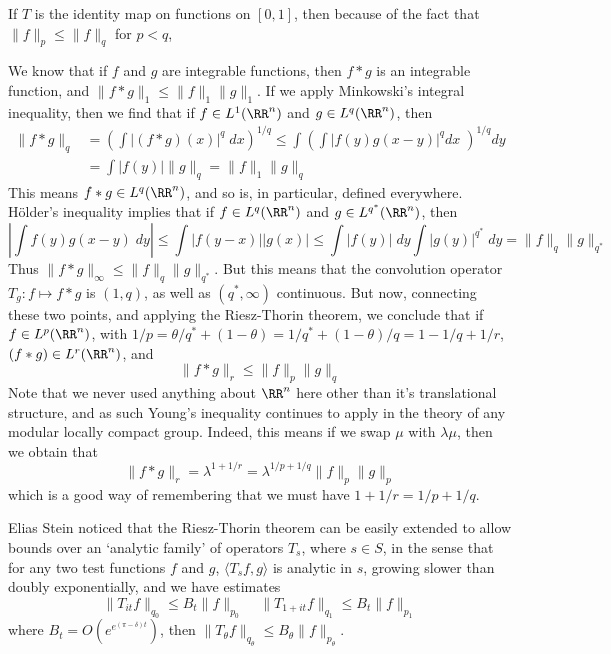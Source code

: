 \begin{example}
    If $T$ is the identity map on functions on $[0,1]$, then because of the fact that $\| f \|_p \leq \| f \|_q$ for $p < q$,
\end{example}

\begin{example}
    We know that if $f$ and $g$ are integrable functions, then $f * g$ is an integrable function, and $\| f * g \|_1 \leq \| f \|_1 \| g \|_1$. If we apply Minkowski's integral inequality, then we find that if $f \in L^1(\RR^n)$ and $g \in L^q(\RR^n)$, then
    \begin{align*}
        \| f * g \|_q &= \left( \int |(f * g)(x)|^q\; dx \right)^{1/q} \leq \int \left( \int |f(y)g(x-y)|^q dx\; \right)^{1/q} dy\\
        &= \int |f(y)| \| g \|_q = \| f \|_1 \| g \|_q
    \end{align*}
    This means $f * g \in L^q(\RR^n)$, and so is, in particular, defined everywhere. H\"{older}'s inequality implies that if $f \in L^q(\RR^n)$ and $g \in L^{q^*}(\RR^n)$, then
    \[ \left| \int f(y) g(x-y)\; dy \right| \leq \int |f(y-x)| |g(x)| \leq \int |f(y)|\; dy \int |g(y)|^{q^*}\; dy = \| f \|_q \| g \|_{q^*} \]
    Thus $\| f * g \|_\infty \leq \| f \|_q \| g \|_{q^*}$. But this means that the convolution operator $T_g: f \mapsto f * g$ is $(1,q)$, as well as $(q^*,\infty)$ continuous. But now, connecting these two points, and applying the Riesz-Thorin theorem, we conclude that if $f \in L^p(\RR^n)$, with $1/p = \theta/q^* + (1 - \theta) = 1/q^* + (1-\theta)/q = 1 - 1/q + 1/r$, $(f * g) \in L^r(\RR^n)$, and
    \[ \| f * g \|_r \leq \| f \|_p \| g \|_q \]
    Note that we never used anything about $\RR^n$ here other than it's translational structure, and as such Young's inequality continues to apply in the theory of any modular locally compact group. Indeed, this means if we swap $\mu$ with $\lambda \mu$, then we obtain that
    \[ \| f * g \|_r = \lambda^{1 + 1/r} = \lambda^{1/p + 1/q} \| f \|_p \| g \|_p \]
    which is a good way of remembering that we must have $1 + 1/r = 1/p + 1/q$. 
\end{example}

Elias Stein noticed that the Riesz-Thorin theorem can be easily extended to allow bounds over an `analytic family' of operators $T_s$, where $s \in S$, in the sense that for any two test functions $f$ and $g$, $\langle T_s f, g \rangle$ is analytic in $s$, growing slower than doubly exponentially, and we have estimates
%
\[ \| T_{it} f \|_{q_0} \leq B_t \| f \|_{p_0}\ \ \ \ \ \| T_{1+it} f \|_{q_1} \leq B_t \| f \|_{p_1} \]
%
where $B_t = O(e^{e^{(\pi - \delta)t}})$, then $\| T_\theta f \|_{q_\theta} \leq B_\theta \| f \|_{p_\theta}$.






